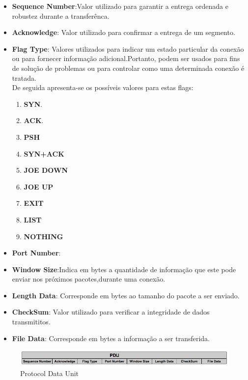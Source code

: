 \documentclass{article}
\begin{document}
\begin{itemize}
    \item \textbf{Sequence Number}:Valor utilizado para garantir a entrega ordenada e robustez durante a transferênca. 
    \item \textbf{Acknowledge}: Valor utilizado para confirmar a entrega de um segmento.
    \item \textbf{Flag Type}: Valores utilizados para indicar um estado particular da conexão ou para fornecer informação adicional.Portanto,
    podem ser usados para fins de solução de problemas ou para controlar como uma determinada conexão é tratada.\\
    De seguida apresenta-se os possíveis valores para estas flags:
    \begin{enumerate}
    \item \textbf{SYN}.
    \item \textbf{ACK}.
    \item \textbf{PSH}
    \item \textbf{SYN+ACK}
    \item \textbf{JOE DOWN}
    \item \textbf{JOE UP}
    \item \textbf{EXIT} 
    \item \textbf{LIST}
    \item \textbf{NOTHING}
    \end{enumerate}
    \item \textbf{Port Number}:
    \item \textbf{Window Size}:Indica em bytes a quantidade de informação que este pode enviar nos próximos pacotes,durante uma conexão.
    \item \textbf{Length Data}: Corresponde em bytes ao tamanho do pacote a ser enviado.
    \item \textbf{CheckSum}: Valor utilizado para verificar a integridade de dados transmititos.
    \item \textbf{File Data}: Corresponde em bytes a informação a ser transferida.
\end{itemize}

\begin{figure}[H]
    \centering
    \includegraphics[scale=0.50]{img/pdu.PNG}
    \caption{Protocol Data Unit}
\end{figure}
\end{document}
